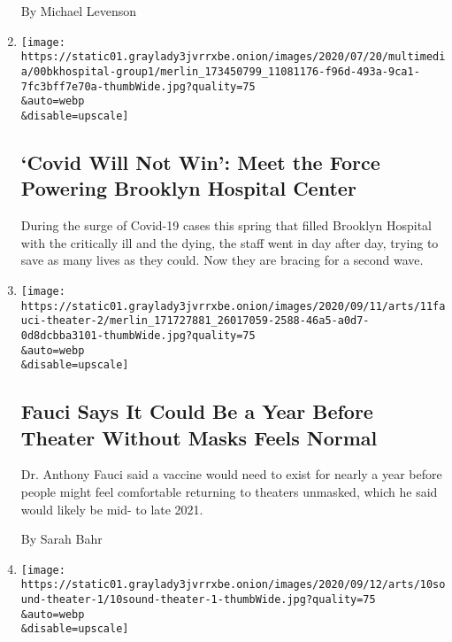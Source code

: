 \begin{enumerate}
  By Michael Levenson
\item
  \href{/2020/09/11/nyregion/coronavirus-brooklyn-hospital-workers.html}{}

  \texttt{[image: https://static01.graylady3jvrrxbe.onion/images/2020/07/20/multimedia/00bkhospital-group1/merlin\_173450799\_11081176-f96d-493a-9ca1-7fc3bff7e70a-thumbWide.jpg?quality=75\\\&auto=webp\\\&disable=upscale]}

  \hypertarget{covid-will-not-win-meet-the-force-powering-brooklyn-hospital-center}{%
  \subsection{`Covid Will Not Win': Meet the Force Powering Brooklyn
  Hospital
  Center}\label{covid-will-not-win-meet-the-force-powering-brooklyn-hospital-center}}

  During the surge of Covid-19 cases this spring that filled Brooklyn
  Hospital with the critically ill and the dying, the staff went in day
  after day, trying to save as many lives as they could. Now they are
  bracing for a second wave.
\item
  \href{/2020/09/11/theater/fauci-theater-reopen.html}{}

  \texttt{[image: https://static01.graylady3jvrrxbe.onion/images/2020/09/11/arts/11fauci-theater-2/merlin\_171727881\_26017059-2588-46a5-a0d7-0d8dcbba3101-thumbWide.jpg?quality=75\\\&auto=webp\\\&disable=upscale]}

  \hypertarget{fauci-says-it-could-be-a-year-before-theater-without-masks-feels-normal}{%
  \subsection{Fauci Says It Could Be a Year Before Theater Without Masks
  Feels
  Normal}\label{fauci-says-it-could-be-a-year-before-theater-without-masks-feels-normal}}

  Dr. Anthony Fauci said a vaccine would need to exist for nearly a year
  before people might feel comfortable returning to theaters unmasked,
  which he said would likely be mid- to late 2021.

  By Sarah Bahr
\item
  \href{/2020/09/11/theater/sound-walks-promenade-plays.html}{}

  \texttt{[image: https://static01.graylady3jvrrxbe.onion/images/2020/09/12/arts/10sound-theater-1/10sound-theater-1-thumbWide.jpg?quality=75\\\&auto=webp\\\&disable=upscale]}


\end{enumerate}
